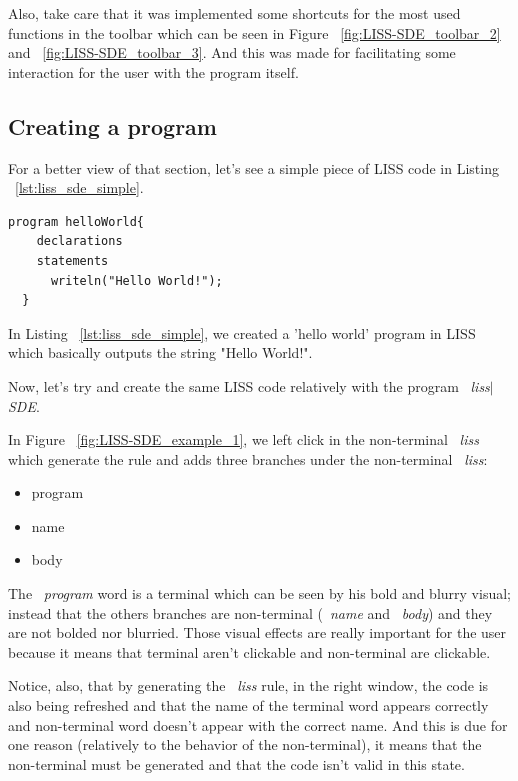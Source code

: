 \documentclass[
  oneside,
  11pt, a4paper,
  footinclude=true,
  headinclude=true,
  cleardoublepage=empty
]{scrbook}
\begin{document}
Also, take care that it was implemented some shortcuts for the most used functions in the toolbar which can be seen in Figure ~\ref{fig:LISS-SDE_toolbar_2} and ~\ref{fig:LISS-SDE_toolbar_3}. And this was made for facilitating some interaction for the user with the program itself.

\newpage

\subsection{Creating a program}
\label{sec:creating_program_liss_sde}

For a better view of that section, let's see a simple piece of LISS code in Listing ~\ref{lst:liss_sde_simple}.

\begin{lstlisting}[caption={LISS code},label={lst:liss_sde_simple}]
  program helloWorld{
    declarations
    statements
      writeln("Hello World!");
  }
\end{lstlisting}

In Listing ~\ref{lst:liss_sde_simple}, we created a 'hello world' program in LISS which basically outputs the string "Hello World!".

Now, let's try and create the same LISS code relatively with the program ~\textit{liss$|$SDE}.


In Figure ~\ref{fig:LISS-SDE_example_1}, we left click in the non-terminal ~\textit{liss} which generate the rule and adds three branches under the non-terminal ~\textit{liss}:

\begin{itemize}
\item program
\item name
\item body
\end{itemize}

The ~\textit{program} word is a terminal which can be seen by his bold and blurry visual; instead that the others branches are non-terminal (~\textit{name} and ~\textit{body}) and they are not bolded nor blurried. Those visual effects are really important for the user because it means that terminal aren't clickable and non-terminal are clickable.

Notice, also, that by generating the ~\textit{liss} rule, in the right window, the code is also being refreshed and that the name of the terminal word appears correctly and non-terminal word doesn't appear with the correct name. And this is due for one reason (relatively to the behavior of the non-terminal), it means that the non-terminal must be generated and that the code isn't valid in this state.
\end{document}
